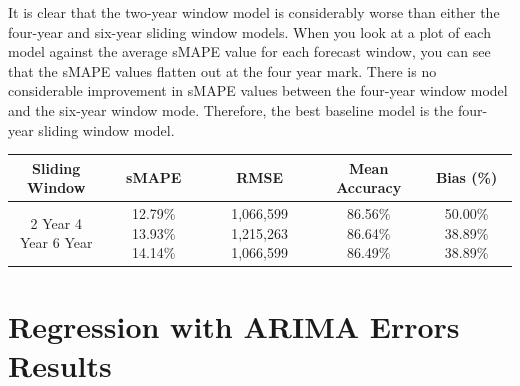 \documentclass[12pt,oneside]{chicagocapstone}
\begin{document}
It is clear that the two-year window model is considerably worse than
either the four-year and six-year sliding window models. When you look
at a plot of each model against the average sMAPE value for each
forecast window, you can see that the sMAPE values flatten out at the
four year mark. There is no considerable improvement in sMAPE values
between the four-year window model and the six-year window mode.
Therefore, the best baseline model is the four-year sliding window
model.
\begin{longtable}[]{@{}ccccc@{}}
\toprule
\begin{minipage}[b]{0.22\columnwidth}\centering\strut
Sliding Window\strut
\end{minipage} & \begin{minipage}[b]{0.16\columnwidth}\centering\strut
sMAPE\strut
\end{minipage} & \begin{minipage}[b]{0.15\columnwidth}\centering\strut
RMSE\strut
\end{minipage} & \begin{minipage}[b]{0.16\columnwidth}\centering\strut
Mean Accuracy\strut
\end{minipage} & \begin{minipage}[b]{0.16\columnwidth}\centering\strut
Bias (\%)\strut
\end{minipage}\tabularnewline
\midrule
\endhead
\begin{minipage}[t]{0.22\columnwidth}\centering\strut
2 Year 4 Year 6 Year\strut
\end{minipage} & \begin{minipage}[t]{0.16\columnwidth}\centering\strut
12.79\% 13.93\% 14.14\%\strut
\end{minipage} & \begin{minipage}[t]{0.15\columnwidth}\centering\strut
1,066,599 1,215,263 1,066,599\strut
\end{minipage} & \begin{minipage}[t]{0.16\columnwidth}\centering\strut
86.56\% 86.64\% 86.49\%\strut
\end{minipage} & \begin{minipage}[t]{0.16\columnwidth}\centering\strut
50.00\% 38.89\% 38.89\%\strut
\end{minipage}\tabularnewline
\bottomrule
\end{longtable}
\section*{Regression with ARIMA Errors
Results}\label{regression-with-arima-errors-results}
\end{document}
